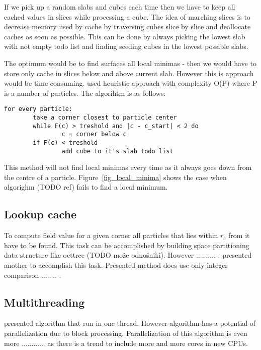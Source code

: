 If we pick up a random slabs and cubes each time then we have to keep all cached values in slices while processing a cube. The idea of marching slices is to decrease memory used by cache by traversing cubes slice by slice and deallocate caches as soon as possible. This can be done by always picking the lowest slab with not empty todo list and finding seeding cubes in the lowest possible slabs. 

The optimum would be to find surfaces all local minimas - then we would have to store only cache in slices below and above current slab. However this is approach would be time consuming. \cite{RosenbergBirdwell2008} used heuristic approach with complexity O(P) where P is a number of particles. The algorihtm is as follows:
\begin{verbatim}
for every particle:
        take a corner closest to particle center
        while F(c) > treshold and |c - c_start| < 2 do
                c = corner below c
        if F(c) < treshold
                add cube to it's slab todo list
\end{verbatim}

This method will not find local minimas every time as it always goes down from the centre of a particle. Figure~\ref{fig_local_minima} shows the case when algorighm (TODO ref) fails to find a local minimum. 


\subsection{Lookup cache}\label{sec:lookupcache}
To compute field value for a given corner all particles that lies within $r_c$ from it have to be found. This task can be accomplished by building space partitioning data structure like octtree (TODO może odnośniki). However .......... . \cite{RosenbergBirdwell2008} presented another to accomplish this task. Presented method does use only integer comparison ........ .


\subsection{Multithreading}
\cite{RosenbergBirdwell2008} presented algorithm that run in one thread. However algorithm has a potential of parallelization due to block processing. Parallelization of this algorithm is even more ............ as there is a trend to include more and more cores in new CPUs. 

